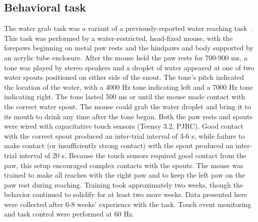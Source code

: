 \documentclass{article}
\begin{document}
\subsection{Behavioral task}
The water grab task was a variant of a previously-reported water reaching task~\cite{galinanes2018directional}. This task was performed by a water-restricted, head-fixed mouse, with the forepaws beginning on metal paw rests and the hindpaws and body supported by an acrylic tube enclosure. After the mouse held the paw rests for 700-900 ms, a tone was played by stereo speakers and a droplet of water appeared at one of two water spouts positioned on either side of the snout. The tone's pitch indicated the location of the water, with a 4000 Hz tone indicating left and a 7000 Hz tone indicating right. The tone lasted 500 ms or until the mouse made contact with the correct water spout. The mouse could grab the water droplet and bring it to its mouth to drink any time after the tone began. Both the paw rests and spouts were wired with capacitative touch sensors (Teensy 3.2, PJRC). Good contact with the correct spout produced an inter-trial interval of 3-6 s, while failure to make contact (or insufficiently strong contact) with the spout produced an inter-trial interval of 20 s. Because the touch sensors required good contact from the paw, this setup encouraged complex contacts with the spouts. The mouse was trained to make all reaches with the right paw and to keep the left paw on the paw rest during reaching. Training took approximately two weeks, though the behavior continued to solidify for at least two more weeks. Data presented here were collected after 6-8 weeks’ experience with the task. Touch event monitoring and task control were performed at 60 Hz.
\end{document}
